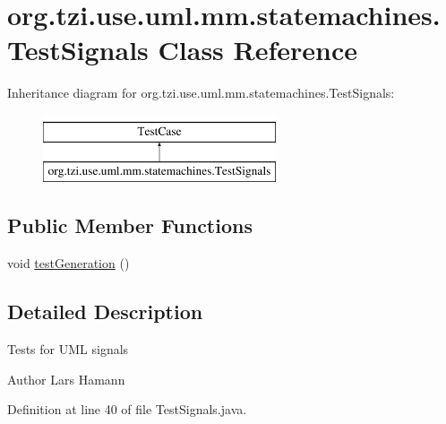 \hypertarget{classorg_1_1tzi_1_1use_1_1uml_1_1mm_1_1statemachines_1_1_test_signals}{\section{org.\-tzi.\-use.\-uml.\-mm.\-statemachines.\-Test\-Signals Class Reference}
\label{classorg_1_1tzi_1_1use_1_1uml_1_1mm_1_1statemachines_1_1_test_signals}
}
Inheritance diagram for org.\-tzi.\-use.\-uml.\-mm.\-statemachines.\-Test\-Signals\-:\begin{figure}[H]
\begin{center}
\leavevmode
\includegraphics[height=2.000000cm]{classorg_1_1tzi_1_1use_1_1uml_1_1mm_1_1statemachines_1_1_test_signals}
\end{center}
\end{figure}
\subsection*{Public Member Functions}
\begin{DoxyCompactItemize}
\item 
void \hyperlink{classorg_1_1tzi_1_1use_1_1uml_1_1mm_1_1statemachines_1_1_test_signals_ac7ed25a534c3dd317591c793d4e77701}{test\-Generation} ()
\end{DoxyCompactItemize}


\subsection{Detailed Description}
Tests for U\-M\-L signals \begin{DoxyAuthor}{Author}
Lars Hamann 
\end{DoxyAuthor}


Definition at line 40 of file Test\-Signals.\-java.



